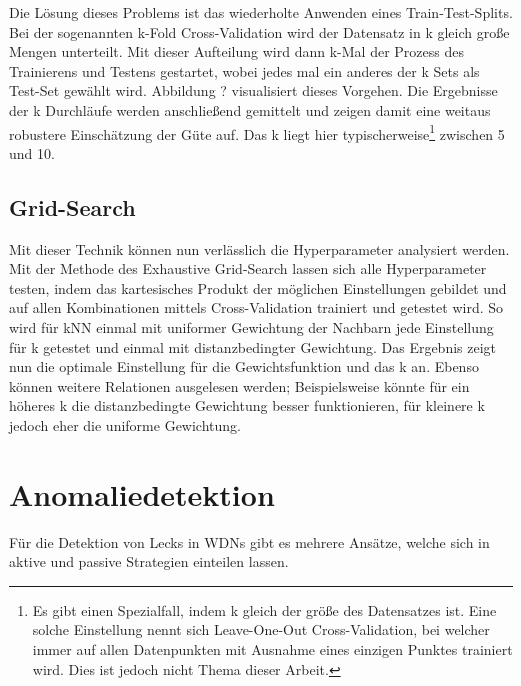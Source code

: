 Die Lösung dieses Problems ist das wiederholte Anwenden eines Train-Test-Splits. Bei der sogenannten
 k-Fold Cross-Validation wird der Datensatz in k gleich große Mengen unterteilt. Mit dieser Aufteilung
 wird dann k-Mal der Prozess des Trainierens und Testens gestartet, wobei jedes mal ein anderes der k Sets als
 Test-Set gewählt wird. Abbildung ? visualisiert dieses Vorgehen. Die Ergebnisse der k Durchläufe werden
 anschließend gemittelt und zeigen damit eine weitaus robustere Einschätzung der Güte auf. Das k liegt hier
 typischerweise\footnote{Es gibt einen Spezialfall, indem k gleich der größe des Datensatzes ist. Eine solche
 Einstellung nennt sich Leave-One-Out Cross-Validation, bei welcher immer auf allen Datenpunkten mit Ausnahme
 eines einzigen Punktes trainiert wird. Dies ist jedoch nicht Thema dieser Arbeit.} zwischen 5 und 10.

\subsection*{Grid-Search}

Mit dieser Technik können nun verlässlich die Hyperparameter analysiert werden. Mit der Methode des Exhaustive
 Grid-Search lassen sich alle Hyperparameter testen, indem das kartesisches Produkt der möglichen Einstellungen
 gebildet und auf allen Kombinationen mittels Cross-Validation trainiert und getestet wird. So wird für kNN einmal
 mit uniformer Gewichtung der Nachbarn jede Einstellung für k getestet und einmal mit distanzbedingter Gewichtung.
 Das Ergebnis zeigt nun die optimale Einstellung für die Gewichtsfunktion und das k an. Ebenso können weitere
 Relationen ausgelesen werden; Beispielsweise könnte für ein höheres k die distanzbedingte Gewichtung besser
 funktionieren, für kleinere k jedoch eher die uniforme Gewichtung.


\section{Anomaliedetektion}

Für die Detektion von Lecks in WDNs gibt es mehrere Ansätze, welche sich in aktive und passive
 Strategien einteilen lassen.

